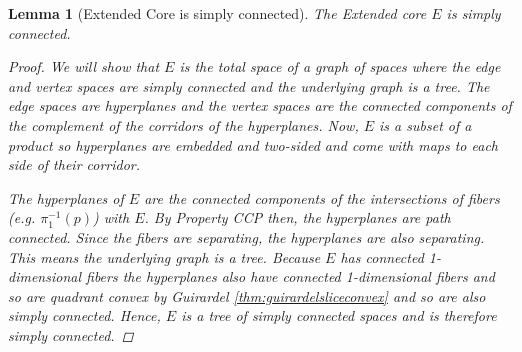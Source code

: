 \documentclass[12pt,parskip=full]{report}
\theoremstyle{plain}
\newtheorem{lem}[thm]{Lemma}
\theoremstyle{definition}
\begin{document}
\begin{lem}
    [Extended Core is simply connected]
    \label{lem:coresc} 
    The Extended core $E$ is simply connected.
    
    \begin{proof}
    
        
    
        We will show that \(E\) is the total space of a graph of spaces where the edge and vertex spaces are simply connected and the underlying graph is a tree. The edge spaces are hyperplanes and the vertex spaces are the connected components of the complement of the corridors of the hyperplanes. Now, $E$ is a subset of a product so hyperplanes are embedded and two-sided and come with maps to each side of their corridor. 
        
        The hyperplanes of \(E\) are the connected components of the intersections of fibers (e.g. \(\pi_1^{-1}(p)\)) with \(E\).
        By Property CCP then, the hyperplanes are path connected. Since the fibers are separating, the hyperplanes are also separating. This means the underlying graph is a tree. Because $E$ has connected 1-dimensional fibers the hyperplanes also have connected 1-dimensional fibers and so are quadrant convex by Guirardel \ref{thm:guirardelsliceconvex} and so are also simply connected. Hence, $E$ is a tree of simply connected spaces and is therefore simply connected.
        
        



        

\end{proof}
\end{lem}
\end{document}
